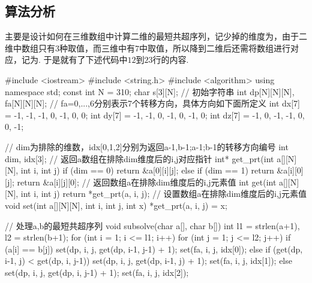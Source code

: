 \documentclass[12pt, a4paper, oneside]{ctexart}
\numberwithin{equation}{section}  %
\begin{document}
\subsection{算法分析}
主要是设计如何在三维数组中计算二维的最短共超序列，记少掉的维度为，由于二维中数组只有$3$种取值，而三维中有$7$中取值，所以降到二维后还需将数组进行对应，记为. 于是就有了下述代码中$12$到$23$行的内容.
\begin{cppcode}
#include <iostream>
#include <string.h>
#include <algorithm>
using namespace std;
const int N = 310;
char s[3][N];  // 初始字符串
int dp[N][N][N], fa[N][N][N]; // fa={0,...,6}分别表示7个转移方向，具体方向如下面所定义
int dx[7] = {-1, -1, -1, 0, -1, 0, 0};
int dy[7] = {-1, -1, 0, -1, 0, -1, 0};
int dz[7] = {-1, 0, -1, -1, 0, 0, -1};

// dim为排除的维数，idx[0,1,2]分别为返回a-1,b-1;a-1;b-1的转移方向编号
int dim, idx[3];
// 返回a数组在排除dim维度后的i,j对应指针
int* get_prt(int a[][N][N], int i, int j) {
    if (dim == 0) return &a[0][i][j];
    else if (dim == 1) return &a[i][0][j];
    return &a[i][j][0];
}
// 返回数组a在排除dim维度后的i,j元素值
int get(int a[][N][N], int i, int j) {return *get_prt(a, i, j);}
// 设置数组a在排除dim维度后的i,j元素值
void set(int a[][N][N], int i, int j, int x) {*get_prt(a, i, j) = x;}

// 处理a,b的最短共超序列
void subsolve(char a[], char b[]) {
    int l1 = strlen(a+1), l2 = strlen(b+1);
    for (int i = 1; i <= l1; i++) {
        for (int j = 1; j <= l2; j++) {
            if (a[i] == b[j]) {
                set(dp, i, j, get(dp, i-1, j-1) + 1);
                set(fa, i, j, idx[0]);
            } else if (get(dp, i-1, j) < get(dp, i, j-1)) {
                set(dp, i, j, get(dp, i-1, j) + 1);
                set(fa, i, j, idx[1]);
            } else {
                set(dp, i, j, get(dp, i, j-1) + 1);
                set(fa, i, j, idx[2]);
            }
        }
    }
}


\end{cppcode}
\end{document}

